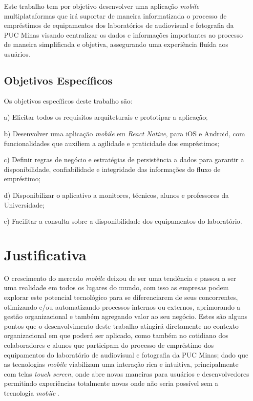     Este trabalho tem por objetivo desenvolver uma aplicação \textit{mobile} multiplataformas que irá suportar de maneira informatizada o processo de empréstimos de equipamentos dos laboratórios de audiovisual e fotografia da PUC Minas visando centralizar os dados e informações importantes ao processo de maneira simplificada e objetiva, assegurando uma experiência fluída aos usuários.
    
\subsection{Objetivos Específicos}
  
  Os objetivos específicos deste trabalho são:

    \begin{compactitem}
      \item[a)] Elicitar todos os requisitos arquiteturais e prototipar a aplicação;
      \item[b)] Desenvolver uma aplicação \textit{mobile} em \textit{React Native}, para iOS e Android, com funcionalidades que auxiliem a agilidade e praticidade dos empréstimos;
      \item[c)] Definir regras de negócio e estratégias de persistência a dados para garantir a disponibilidade, confiabilidade e integridade das informações do fluxo de empréstimo;
      \item[d)] Disponibilizar o aplicativo a monitores, técnicos, alunos e professores da Universidade;
      \item[e)] Facilitar a consulta sobre a disponibilidade dos equipamentos do laboratório.
    \end{compactitem}

\section{Justificativa}

    O crescimento do mercado \textit{mobile} deixou de ser uma tendência e passou a ser uma realidade em todos os lugares do mundo, com isso as empresas podem explorar este potencial tecnológico para se diferenciarem de seus concorrentes, otimizando e/ou automatizando processos internos ou externos, aprimorando a gestão organizacional e também agregando valor ao seu negócio. Estes são alguns pontos que o desenvolvimento deste trabalho atingirá diretamente no contexto organizacional em que poderá ser aplicado, como também no cotidiano dos colaboradores e alunos que participam do processo de empréstimo dos equipamentos do laboratório de audiovisual e fotografia da PUC Minas; dado que as tecnologias \textit{mobile} viabilizam uma interação rica e intuitiva, principalmente com telas \textit{touch screen}, onde abre novas maneiras para usuários e desenvolvedores permitindo experiências totalmente novas onde não seria possível sem a tecnologia \textit{mobile} \cite{SousaMonteiro2015}.
    
